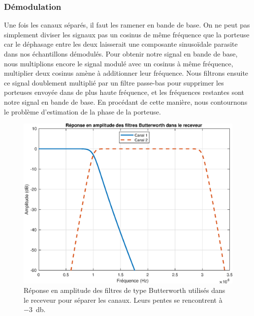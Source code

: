 \documentclass[10pt, oneside, a4paper]{article}
\begin{document}
\subsubsection{Démodulation}
Une fois les canaux séparés, il faut les ramener en bande de base.
On ne peut pas simplement diviser les signaux pas un cosinus de même fréquence que la porteuse car le déphasage entre les deux laisserait une composante sinusoïdale parasite dans nos échantillons démodulés.
Pour obtenir notre signal en bande de base, nous multiplions encore le signal modulé avec un cosinus à même fréquence, multiplier deux cosinus amène à additionner leur fréquence.
Nous filtrons ensuite ce signal doublement multiplié par un filtre passe-bas pour supprimer les porteuses envoyée dans de plus haute fréquence, et les fréquences restantes sont notre signal en bande de base.
En procédant de cette manière, nous contournons le problème d'estimation de la phase de la porteuse.

\begin{figure}[p]
    \centering
    \includegraphics[height=0.4\textheight]{eps/filters.eps}
    \caption{Réponse en amplitude des filtres de type Butterworth utilisés dans le receveur
             pour séparer les canaux.
             Leurs pentes se rencontrent à \SI{-3}{\decibel}.}
    \label{fig:filters}
\end{figure}
\end{document}
